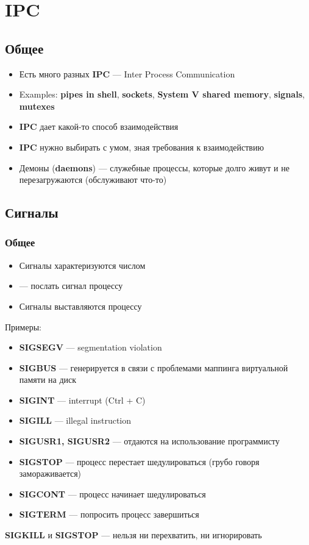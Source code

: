 \documentclass[../../lectures.tex]{subfiles}
\begin{document}
\chapter{IPC}

\section{Общее}
\begin{itemize}
    \item Есть много разных \textbf{IPC} --- Inter Process Communication
    \item Examples: \textbf{pipes in shell}, \textbf{sockets}, \textbf{System V shared memory},
          \textbf{signals}, \textbf{mutexes}
    \item \textbf{IPC} дает какой-то способ взаимодействия
    \item \textbf{IPC} нужно выбирать с умом, зная требования к взаимодействию
    \item Демоны (\textbf{daemons}) --- служебные процессы, которые долго живут 
          и не перезагружаются (обслуживают что-то)
\end{itemize}

\newpage
\section{Сигналы}
\subsection{Общее}
\begin{itemize}
    \item Сигналы характеризуются числом
    \item {} --- послать сигнал процессу
    \item Сигналы выставляются процессу
\end{itemize}

Примеры:
\begin{itemize}
    \item \textbf{SIGSEGV} --- segmentation violation
    \item \textbf{SIGBUS} --- генерируется в связи с проблемами маппинга виртуальной памяти на диск 
    \item \textbf{SIGINT} --- interrupt (Ctrl + C)
    \item \textbf{SIGILL} --- illegal instruction
    \item \textbf{SIGUSR1, SIGUSR2} --- отдаются на использование программисту
    \item \textbf{SIGSTOP} --- процесс перестает шедулироваться (грубо говоря замораживается)
    \item \textbf{SIGCONT} --- процесс начинает шедулироваться 
    \item \textbf{SIGTERM} --- попросить процесс завершиться
\end{itemize}
\textbf{SIGKILL} и \textbf{SIGSTOP} --- нельзя ни перехватить, ни игнорировать
\end{document}
